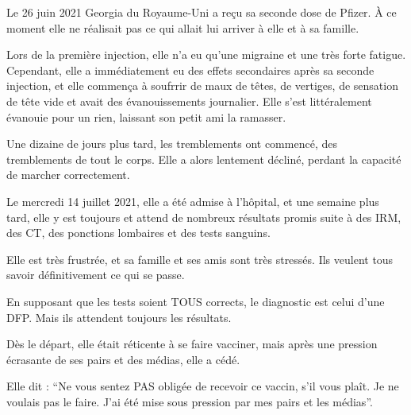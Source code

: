 Le 26 juin 2021 Georgia du Royaume-Uni a reçu sa seconde dose de Pfizer. À ce
moment elle ne réalisait pas ce qui allait lui arriver à elle et à sa famille.

Lors de la première injection, elle n'a eu qu'une migraine et une très forte
fatigue. Cependant, elle a immédiatement eu des effets secondaires après sa
seconde injection, et elle commença à soufrrir de maux de têtes, de vertiges, de
sensation de tête vide et avait des évanouissements journalier. Elle s'est
littéralement évanouie pour un rien, laissant son petit ami la ramasser.

Une dizaine de jours plus tard, les tremblements ont commencé, des tremblements
de tout le corps. Elle a alors lentement décliné, perdant la capacité de marcher
correctement.

Le mercredi 14 juillet 2021, elle a été admise à l'hôpital, et une semaine plus
tard, elle y est toujours et attend de nombreux résultats promis suite à des
IRM, des CT, des ponctions lombaires et des tests sanguins.

Elle est très frustrée, et sa famille et ses amis sont très stressés. Ils
veulent tous savoir définitivement ce qui se passe.

En supposant que les tests soient TOUS corrects, le diagnostic est celui d'une
DFP. Mais ils attendent toujours les résultats.

Dès le départ, elle était réticente à se faire vacciner, mais après une pression
écrasante de ses pairs et des médias, elle a cédé.

Elle dit : “Ne vous sentez PAS obligée de recevoir ce vaccin, s'il vous
plaît. Je ne voulais pas le faire. J'ai été mise sous pression par mes pairs et
les médias”.

